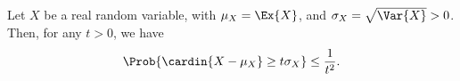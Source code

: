 \begin{theorem}
        Let $X$ be a real random variable, with $\mu_X = \Ex{X}$, and
        $\sigma_X = \sqrt{\Var{X}}>0$. Then, for any $t > 0$, we have
        \begin{equation*}
            \Prob{\bigl. \cardin{X - \mu_X} \geq t \sigma_X} \leq
            \frac{1}{t^2}.
        \end{equation*}
    \end{theorem}
